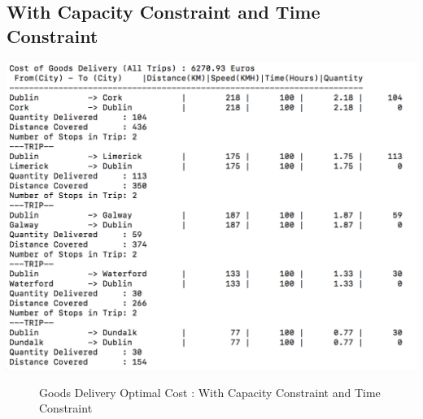 \documentclass[a4paper&11pt]{article}
\begin{document}
\subsection*{With Capacity Constraint and Time Constraint}

\begin{center}
\includegraphics[scale=0.8]{30fig4.png}
\begin{figure}[H]
\caption{Goods Delivery Optimal Cost :  With Capacity Constraint  and Time Constraint}
\end{figure}
\end{center}
\end{document}
